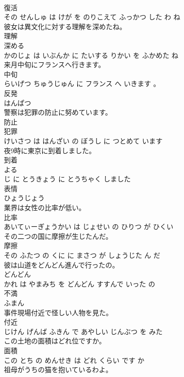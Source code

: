 \documentclass[8pt]{extreport}
\begin{document}
\begin{CJK}{UTF8}{min}
\\	復活 
\\	その せんしゅ は けが を のりこえて ふっかつ した わ ね			
\\	彼女は異文化に対する理解を深めたね。	
\\	理解 
\\	深める 
\\	かのじょ は いぶんか に たいする りかい を ふかめた ね			
\\	来月中旬にフランスへ行きます。	
\\	中旬 
\\	らいげつ ちゅうじゅん に フランス へ いきます 。			
\\	反発	
\\	はんぱつ			
\\	警察は犯罪の防止に努めています。	
\\	防止 
\\	犯罪 
\\	けいさつ は はんざい の ぼうし に つとめて います			
\\	夜9時に東京に到着しました。	
\\	到着 
\\	よる 
\\	じ に とうきょう に とうちゃく しました			
\\	表情	
\\	ひょうじょう			
\\	業界は女性の比率が低い。	
\\	比率 
\\	あいてぃーぎょうかい は じょせい の ひりつ が ひくい			
\\	その二つの国に摩擦が生じたんだ。	
\\	摩擦 
\\	その ふたつ の くに に まさつ が しょうじた ん だ			
\\	彼は山道をどんどん進んで行ったの。	
\\	どんどん 
\\	かれ は やまみち を どんどん すすんで いった の			
\\	不満	
\\	ふまん			
\\	事件現場付近で怪しい人物を見た。	
\\	付近 
\\	じけん げんば ふきん で あやしい じんぶつ を みた			
\\	この土地の面積はどれ位ですか。	
\\	面積 
\\	この とち の めんせき は どれ くらい です か			
\\	祖母がうちの猫を抱いているわよ。	

\end{CJK}
\end{document}
